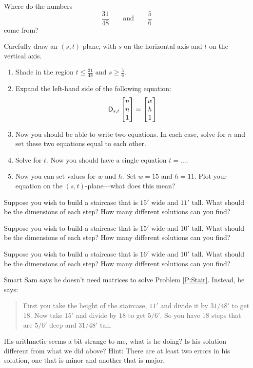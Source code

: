 \begin{prob}
Where do the numbers 
\[
\frac{31}{48}\qquad\text{and}\qquad \frac{5}{6}
\]
come from?
\end{prob}


\begin{prob}
Carefully draw an $(s,t)$-plane, with $s$ on the horizontal axis and $t$ on the vertical axis. 
\begin{enumerate}
\item Shade in the region  $t\le \frac{31}{48}$ and $s\ge \frac{5}{6}$.
\item Expand the left-hand side of the following equation: 
\[
\mathsf{D}_{s,t}
\begin{bmatrix}
n \\ n \\ 1
\end{bmatrix}
= 
\begin{bmatrix}
w \\
h \\
1
\end{bmatrix}
\]
\item Now you should be able to write two equations. In each case, solve for $n$ and set these two equations equal to each other. 
\item Solve for $t$. Now you should have a single equation $t= \dots$.
\item Now you can set values for $w$ and $h$. Set $w = 15$ and $h=11$. Plot your equation on the $(s,t)$-plane---what does this mean?
\end{enumerate}
\end{prob}


\begin{prob}\label{P:Stair}
Suppose you wish to build a staircase that is $15'$ wide and $11'$
tall. What should be the dimensions of each step? How many different
solutions can you find?
\end{prob}

\begin{prob}
Suppose you wish to build a staircase that is $15'$ wide and $10'$
tall. What should be the dimensions of each step? How many different
solutions can you find?
\end{prob}

\begin{prob}
Suppose you wish to build a staircase that is $16'$ wide and $10'$
tall. What should be the dimensions of each step? How many different
solutions can you find?
\end{prob}


\begin{prob}
Smart Sam says he doesn't need matrices to solve
Problem \ref{P:Stair}. Instead, he says:
\begin{quote}
First you take the height of the staircase, $11'$ and divide it by
$31/48'$ to get $18$. Now take $15'$ and divide by $18$ to get
$5/6'$. So you have $18$ steps that are $5/6'$ deep and $31/48'$ tall.
\end{quote}
His arithmetic seems a bit strange to me, what is he doing?  Is his
solution different from what we did above? Hint: There are at least
two errors in his solution, one that is minor and another that is
major.
\end{prob}
